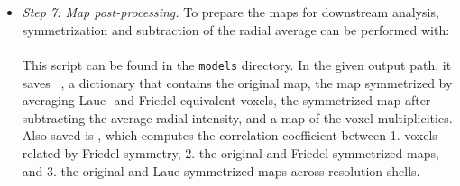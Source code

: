 \documentclass{article}
\begin{document}
\begin{itemize}
%
\item \emph{Step 7: Map post-processing.}
To prepare the maps for downstream analysis, symmetrization and subtraction of the radial average can be performed with:
\\[0.2cm]
\texttt{ }
\\[0.2cm]
This script can be found in the \texttt{models} directory. In the given output path, it saves \texttt{ }, a dictionary that contains the original map, the map symmetrized by averaging Laue- and Friedel-equivalent voxels, the symmetrized map after subtracting the average radial intensity, and a map of the voxel multiplicities. Also saved is \texttt{}, which computes the correlation coefficient between 1. voxels related by Friedel symmetry, 2. the original and Friedel-symmetrized maps, and 3. the original and Laue-symmetrized maps across \texttt{} resolution shells.
\end{itemize}
\end{document}
